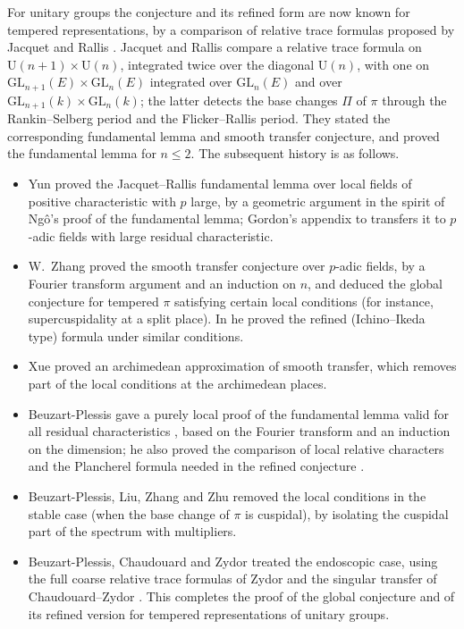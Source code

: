\documentclass[11pt,oneside,notitlepage]{book}
\numberwithin{equation}{section}
\theoremstyle{plain}
\theoremstyle{definition}
\newcommand{\GL}{\mathrm{GL}}
\begin{document}
For unitary groups the conjecture and its refined form are now known for tempered representations, by a comparison of relative trace formulas proposed by Jacquet and Rallis \cite{JR}. Jacquet and Rallis compare a relative trace formula on $\mathrm U(n+1)\times\mathrm U(n)$, integrated twice over the diagonal $\mathrm U(n)$, with one on $\GL_{n+1}(E)\times\GL_n(E)$ integrated over $\GL_n(E)$ and over $\GL_{n+1}(k)\times\GL_n(k)$; the latter detects the base changes $\Pi$ of $\pi$ through the Rankin--Selberg period and the Flicker--Rallis period. They stated the corresponding fundamental lemma and smooth transfer conjecture, and proved the fundamental lemma for $n\le2$. The subsequent history is as follows.
\begin{itemize}
	\item Yun \cite{Yun} proved the Jacquet--Rallis fundamental lemma over local fields of positive characteristic with $p$ large, by a geometric argument in the spirit of Ng\^o's proof of the fundamental lemma; Gordon's appendix to \cite{Yun} transfers it to $p$-adic fields with large residual characteristic.
	\item W.~Zhang \cite{ZhangFT} proved the smooth transfer conjecture over $p$-adic fields, by a Fourier transform argument and an induction on $n$, and deduced the global conjecture for tempered $\pi$ satisfying certain local conditions (for instance, supercuspidality at a split place). In \cite{ZhangRefined} he proved the refined (Ichino--Ikeda type) formula under similar conditions.
	\item Xue \cite{Xue} proved an archimedean approximation of smooth transfer, which removes part of the local conditions at the archimedean places.
	\item Beuzart-Plessis gave a purely local proof of the fundamental lemma valid for all residual characteristics \cite{BP}, based on the Fourier transform and an induction on the dimension; he also proved the comparison of local relative characters and the Plancherel formula needed in the refined conjecture \cite{BPchar,BPplanch}.
	\item Beuzart-Plessis, Liu, Zhang and Zhu \cite{BPLZZ} removed the local conditions in the stable case (when the base change of $\pi$ is cuspidal), by isolating the cuspidal part of the spectrum with multipliers.
	\item Beuzart-Plessis, Chaudouard and Zydor \cite{BPCZ} treated the endoscopic case, using the full coarse relative trace formulas of Zydor \cite{Zydor} and the singular transfer of Chaudouard--Zydor \cite{CZ}. This completes the proof of the global conjecture and of its refined version for tempered representations of unitary groups.
\end{itemize}
\end{document}
